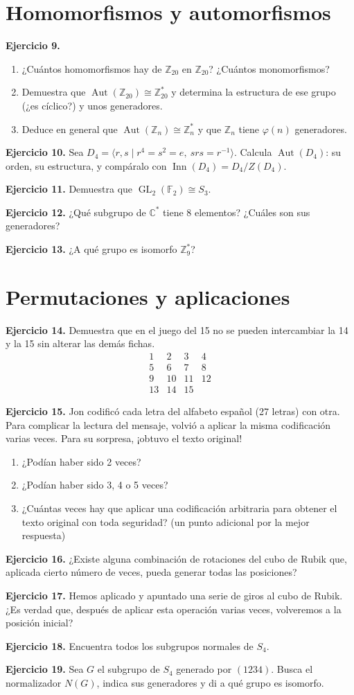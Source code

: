 \documentclass[11pt,a4paper]{article}
\newcommand{\Z}{\mathbb Z}
\newcommand{\F}{\mathbb F}
\newcommand{\C}{\mathbb C}
\newcommand{\ej}[1]{\par\medskip\textbf{Ejercicio #1.}\enspace}
\begin{document}
\section{Homomorfismos y automorfismos}
\ej{9}
\begin{enumerate}[label=(\alph*)]
\item ¿Cuántos homomorfismos hay de $\Z_{20}$ en $\Z_{20}$? ¿Cuántos monomorfismos?
\item Demuestra que $\operatorname{Aut}(\Z_{20})\cong\Z_{20}^{*}$ y determina la estructura de ese grupo (¿es cíclico?) y unos generadores.
\item Deduce en general que $\operatorname{Aut}(\Z_n)\cong\Z_n^*$ y que $\Z_n$ tiene $\varphi(n)$ generadores.
\end{enumerate}
\ej{10} Sea $D_4=\langle r,s\mid r^4=s^2=e,\ srs=r^{-1}\rangle$. Calcula $\operatorname{Aut}(D_4)$: su orden, su estructura, y compáralo con $\operatorname{Inn}(D_4)=D_4/Z(D_4)$.
\ej{11} Demuestra que $\operatorname{GL}_2(\F_2)\cong S_3$.
\ej{12} ¿Qué subgrupo de $\C^*$ tiene 8 elementos? ¿Cuáles son sus generadores?
\ej{13} ¿A qué grupo es isomorfo $\Z_9^*$?
\section{Permutaciones y aplicaciones}
\ej{14} Demuestra que en el juego del 15 no se pueden intercambiar la 14 y la 15 sin alterar las demás fichas.
\[\begin{array}{cccc}1&2&3&4\\5&6&7&8\\9&10&11&12\\13&14&15&\phantom{0}\end{array}\]
\ej{15} Jon codificó cada letra del alfabeto español (27 letras) con otra. Para complicar la lectura del mensaje, volvió a aplicar la misma codificación varias veces. Para su sorpresa, ¡obtuvo el texto original!
\begin{enumerate}[label=(\alph*)]
\item ¿Podían haber sido 2 veces?
\item ¿Podían haber sido 3, 4 o 5 veces?
\item ¿Cuántas veces hay que aplicar una codificación arbitraria para obtener el texto original con toda seguridad? (un punto adicional por la mejor respuesta)
\end{enumerate}
\ej{16} ¿Existe alguna combinación de rotaciones del cubo de Rubik que, aplicada cierto número de veces, pueda generar todas las posiciones?
\ej{17} Hemos aplicado y apuntado una serie de giros al cubo de Rubik. ¿Es verdad que, después de aplicar esta operación varias veces, volveremos a la posición inicial?
\ej{18} Encuentra todos los subgrupos normales de $S_4$.
\ej{19} Sea $G$ el subgrupo de $S_4$ generado por $(1234)$. Busca el normalizador $N(G)$, indica sus generadores y di a qué grupo es isomorfo.
\end{document}
